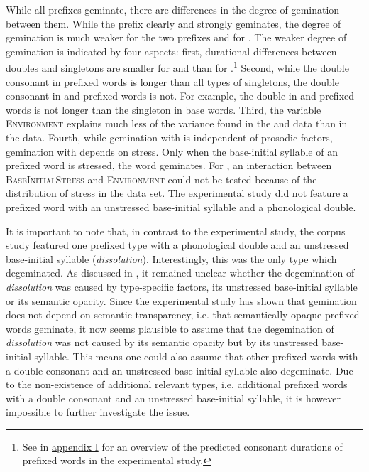 While all prefixes geminate, there are differences in the degree of gemination between them. While the prefix  clearly and strongly geminates, the degree of gemination is much weaker for the two prefixes and for . The weaker degree of gemination is indicated by four aspects: first, durational differences between doubles and singletons are smaller for  and  than for .\footnote{See  in \hyperref[Appendix I: Predicted Durations Experiment]{appendix I} for an overview of the predicted consonant durations of prefixed words in the experimental study.} Second, while the double consonant in prefixed words is longer than all types of singletons, the double consonant in  and prefixed words is not. For example, the double in  and prefixed words is not longer than the singleton in base words. Third, the variable \textsc{Environment} explains much less of the variance found in the  and data than in the data. 
Fourth, while gemination with  is independent of prosodic factors, gemination with  depends on stress. Only when the base-initial syllable of an prefixed word is stressed, the word geminates. For , an interaction between \textsc{BaseInitialStress} and \textsc{Environment} could not be tested because of the distribution of stress in the data set. The experimental study did not feature a prefixed word with an unstressed base-initial syllable and a phonological double.

It is important to note that, in contrast to the experimental study, the corpus study featured one prefixed type with a phonological double and an unstressed base-initial syllable (\textit{dissolution}). Interestingly, this was the only type which degeminated. As discussed in , it remained unclear whether the degemination of \textit{dissolution} was caused by type-specific factors, its unstressed base-initial syllable or its semantic opacity.
Since the experimental study has shown that gemination does not depend on semantic transparency, i.e. that semantically opaque prefixed words geminate,  it now seems plausible to assume that the degemination of \textit{dissolution} was not  caused by its semantic opacity but by its unstressed base-initial syllable. This means one could also assume that other prefixed words with a double consonant and an unstressed base-initial syllable also degeminate. Due to the non-existence of additional relevant types, i.e. additional prefixed words with a double consonant and an unstressed base-initial syllable, it is however impossible to further investigate the issue. 




